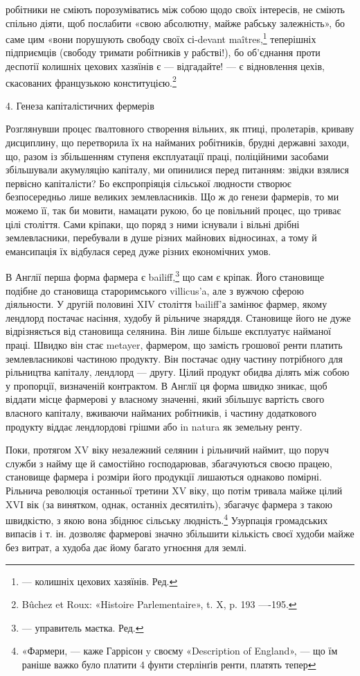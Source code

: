 \parcont{}  %
робітники не сміють порозуміватись між собою щодо своїх інтересів,
не сміють спільно діяти, щоб послабити «свою абсолютну,
майже рабську залежність», бо саме цим «вони порушують свободу
своїх сі-devant maîtres,\footnote*{
— колишніх цехових хазяїнів. Ред.
} теперішніх підприємців (свободу
тримати робітників у рабстві!), бо об’єднання проти деспотії
колишніх цехових хазяїнів є — відгадайте! — є відновлення цехів,
скасованих французькою конституцією.\footnote{
Bûchez et Roux: «Histoire Parlementaire», t. X, p. 193 —-195.
}

4. Генеза капіталістичних фермерів

Розглянувши процес ґвалтовного створення вільних, як птиці,
пролетарів, криваву дисциплину, що перетворила їх на найманих
робітників, брудні державні заходи, що, разом із збільшенням
ступеня експлуатації праці, поліційними засобами збільшували
акумуляцію капіталу, ми опинилися перед питанням: звідки взялися
первісно капіталісти? Бо експропріяція сільської людности
створює безпосередньо лише великих землевласників. Що ж до
генези фармерів, то ми можемо її, так би мовити, намацати рукою,
бо це повільний процес, що триває цілі століття. Сами кріпаки,
що поряд з ними існували і вільні дрібні землевласники, перебували
в душе різних майнових відносинах, а тому й емансипація
їх відбулася серед дуже різних економічних умов.

В Англії перша форма фармера є bailiff,\footnote*{
— управитель маєтка. Ред.
} що сам є кріпак.
Його становище подібне до становища староримського villicus’a,
але з вужчою сферою діяльности. У другій половині XIV століття
bailiff’а замінює фармер, якому лендлорд постачає насіння,
худобу й рільниче знаряддя. Становище його не дуже відрізняється
від становища селянина. Він лише більше експлуатує
найманої праці. Швидко він стає metayer, фармером, що замість
грошової ренти платить землевласникові частиною продукту.
Він постачає одну частину потрібного для рільництва капіталу,
лендлорд — другу. Цілий продукт обидва ділять між собою у
пропорції, визначеній контрактом. В Англії ця форма швидко
зникає, щоб віддати місце фармерові у власному значенні, який
збільшує вартість свого власного капіталу, вживаючи найманих
робітників, і частину додаткового продукту віддає лендлордові
грішми або in natura як земельну ренту.

Поки, протягом XV віку незалежний селянин і рільничий
наймит, що поруч служби з найму ще й самостійно господарював,
збагачуються своєю працею, становище фармера і розміри його
продукції лишаються однаково помірні. Рільнича революція
останньої третини XV віку, що потім тривала майже цілий XVI вік
(за винятком, однак, останніх десятиліть), збагачує фармера з
такою швидкістю, з якою вона збіднює сільську людність.\footnote{
«Фармери, — каже Гаррісон y своєму «Description of England», —
що їм раніше важко було платити 4 фунти стерлінґів ренти, платять тепер
}
Узурпація громадських випасів і т. ін. дозволяє фармерові значно
збільшити кількість своєї худоби майже без витрат, а худоба дає
йому багато угноєння для землі.

